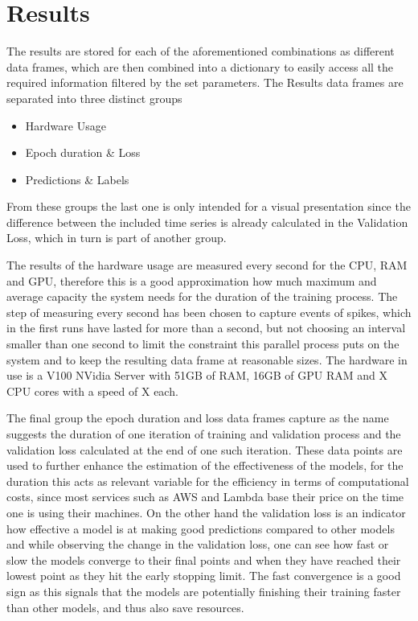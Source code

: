 \documentclass{article}
\begin{document}
\section{Results}

The results are stored for each of the aforementioned combinations as different data frames, which are then combined into a dictionary to easily access all the required information filtered by the set parameters. The Results data frames are separated into three distinct groups
\begin{multicols}{3}
    \begin{itemize}
        \item Hardware Usage
        \item Epoch duration \& Loss
        \item Predictions \& Labels
    \end{itemize}
\end{multicols}
From these groups the last one is only intended for a visual presentation since the difference between the included time series is already calculated in the Validation Loss, which in turn is part of another group.

The results of the hardware usage are measured every second for the CPU, RAM and GPU, therefore this is a good approximation how much maximum and average capacity the system needs for the duration of the training process. The step of measuring every second has been chosen to capture events of spikes, which in the first runs have lasted for more than a second, but not choosing an interval smaller than one second to limit the constraint this parallel process puts on the system and to keep the resulting data frame at reasonable sizes. The hardware in use is a V100 NVidia Server with 51GB of RAM, 16GB of GPU RAM and X CPU cores with a speed of X each. 

The final group the epoch duration and loss data frames capture as the name suggests the duration of one iteration of training and validation process and the validation loss calculated at the end of one such iteration. These data points are used to further enhance the estimation of the effectiveness of the models, for the duration this acts as relevant variable for the efficiency in terms of computational costs, since most services such as AWS and Lambda base their price on the time one is using their machines. On the other hand the validation loss is an indicator how effective a model is at making good predictions compared to other models and while observing the change in the validation loss, one can see how fast or slow the models converge to their final points and when they have reached their lowest point as they hit the early stopping limit. The fast convergence is a good sign as this signals that the models are potentially finishing their training faster than other models, and thus also save resources.
\end{document}

